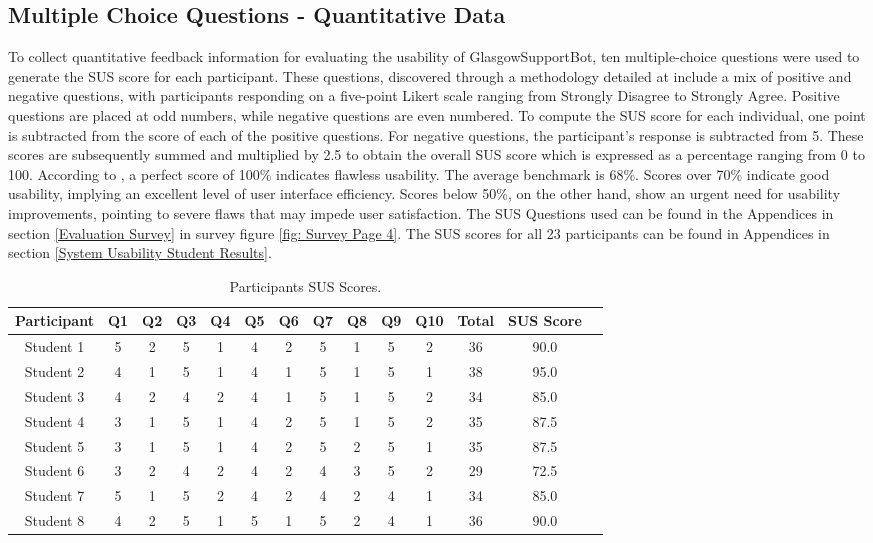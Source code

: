 \documentclass{l4proj}
\begin{document}
\subsection{Multiple Choice Questions - Quantitative Data}


To collect quantitative feedback information for evaluating the usability of GlasgowSupportBot, ten multiple-choice questions were used to generate the SUS score for each participant. These questions, discovered through a methodology detailed at \cite{questionproSystemUsability} include a mix of positive and negative questions, with participants responding on a five-point Likert scale ranging from Strongly Disagree to Strongly Agree. Positive questions are placed at odd numbers, while negative questions are even numbered. To compute the SUS score for each individual, one point is subtracted from the score of each of the positive questions. For negative questions, the participant's response is subtracted from 5. These scores are subsequently summed and multiplied by 2.5 to obtain the overall SUS score which is expressed as a percentage ranging from 0 to 100. According to \cite{questionproSystemUsability}, a perfect score of 100\% indicates flawless usability. The average benchmark is 68\%. Scores over 70\% indicate good usability, implying an excellent level of user interface efficiency. Scores below 50\%, on the other hand, show an urgent need for usability improvements, pointing to severe flaws that may impede user satisfaction. The SUS Questions used can be found in the Appendices in section \ref{Evaluation Survey} in survey figure \ref{fig: Survey Page 4}. The SUS scores for all 23 participants can be found in Appendices in section \ref{System Usability Student Results}.


\begin{table}[htbp]
  \centering
  \begin{tabular}{cccccccccccccc}
    \toprule
    Participant & Q1 & Q2 & Q3 & Q4 & Q5 & Q6 & Q7 & Q8 & Q9 & Q10 & Total & SUS Score \\
    \midrule
    Student 1 & 5 & 2 & 5 & 1 & 4 & 2 & 5 & 1 & 5 & 2 & 36 & 90.0 \\
    Student 2 & 4 & 1 & 5 & 1 & 4 & 1 & 5 & 1 & 5 & 1 & 38 & 95.0 \\
    Student 3 & 4 & 2 & 4 & 2 & 4 & 1 & 5 & 1 & 5 & 2 & 34 & 85.0 \\
    Student 4 & 3 & 1 & 5 & 1 & 4 & 2 & 5 & 1 & 5 & 2 & 35 & 87.5 \\
    Student 5 & 3 & 1 & 5 & 1 & 4 & 2 & 5 & 2 & 5 & 1 & 35 & 87.5 \\
    Student 6 & 3 & 2 & 4 & 2 & 4 & 2 & 4 & 3 & 5 & 2 & 29 & 72.5 \\
    Student 7 & 5 & 1 & 5 & 2 & 4 & 2 & 4 & 2 & 4 & 1 & 34 & 85.0 \\
    Student 8 & 4 & 2 & 5 & 1 & 5 & 1 & 5 & 2 & 4 & 1 & 36 & 90.0 \\
    \bottomrule
  \end{tabular}
    \caption{Participants SUS Scores.}
    \label{table: Participants SUS Scores.}
\end{table}
\end{document}
